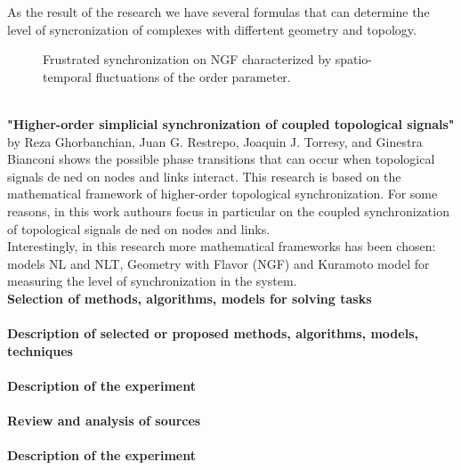 \documentclass[draft]{article}
\newcommand\tab[1][1cm]{\hspace*{#1}}
\begin{document}
\tab As the result of the research we have several formulas that can determine the level of syncronization of complexes with differtent geometry and topology.
\begin{figure}[h]
\caption{Frustrated synchronization on NGF characterized by spatio-temporal fluctuations of the order parameter\cite{litlink3}.}
\label{ris:image}
\end{figure}\\
\tab \textbf{"Higher-order simplicial synchronization of coupled topological signals"\cite{litlink5}} by Reza Ghorbanchian, Juan G. Restrepo, Joaquin J. Torresy, and Ginestra Bianconi shows the possible phase transitions that can occur when topological signals dened on nodes and links interact. This research is based on the mathematical framework of higher-order topological synchronization. For some reasons, in this work authours focus in particular on the coupled synchronization of topological signals dened on nodes and links.\\
\tab Interestingly, in this research more mathematical frameworks has been chosen: models NL and NLT, Geometry with Flavor (NGF) and Kuramoto model for measuring the level of synchronization in the system.
~\\
\textbf{Selection of methods, algorithms, models for solving tasks}\\
~\\
\textbf{Description of selected or proposed methods, algorithms, models, techniques}\\
~\\
\textbf{Description of the experiment}\\
~\\
\textbf{Review and analysis of sources}\\
~\\
\textbf{Description of the experiment}\\
~\\
\end{document}

